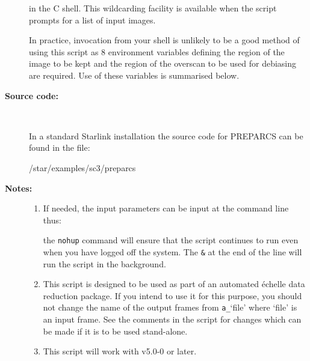 \documentclass[twoside,11pt]{starlink}
\begin{document}
\begin{description}
\begin{terminalv}
\end{terminalv}

     in the C shell.  This wildcarding facility is available when the
     script prompts for a list of input images.

     In practice, invocation from your shell is unlikely to be a good
     method of using this script as 8 environment variables defining
     the region of the image to be kept and the region of the overscan
     to be used for debiasing are required.  Use of these variables is
     summarised below.

\item [\textbf{Source code:}] \mbox{} \\
\begin{latexonly}
In a standard Starlink installation the source code for PREPARCS can be found
in the file:
\begin{terminalv}
   /star/examples/sc3/preparcs
\end{terminalv}
\end{latexonly}



\item [\textbf{Notes:}] \mbox{}
\begin{enumerate}

\item If needed, the input parameters can be input at the command
      line thus:

\begin{terminalv}
\end{terminalv}

      the \verb+nohup+ command will ensure that the script continues
      to run even when you have logged off the system.  The \verb+&+ at
      the end of the line will run the script in the background.

\item This script is designed to be used as part of an automated
      \'{e}chelle data reduction package.  If you intend to use it
      for this purpose, you should not change the name of the output
      frames from \verb+a_+`file' where `file' is an input frame.  See the
      comments in the script for changes which can be made if it is
      to be used stand-alone.

\item This script will work with  v5.0-0 or later.


\end{enumerate}
\end{description}
\end{document}
